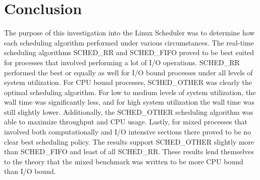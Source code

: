 ﻿\section{Conclusion}

The purpose of this investigation into the Linux Scheduler was to determine how each scheduling algorithm performed under various circumstances.  The real-time scheduling algorithms SCHED\_RR and SCHED\_FIFO proved to be best suited for processes that involved performing a lot of I/O operations.  SCHED\_RR performed the best or equally as well for I/O bound processes under all levels of system utilization.  For CPU bound processes, SCHED\_OTHER was clearly the optimal scheduling algorithm.  For low to medium levels of system utilization, the wall time was significantly less, and for high system utilization the wall time was still slightly lower.  Additionally, the SCHED\_OTHER scheduling algorithm was able to maximize throughput and CPU usage.  Lastly, for mixed processes that involved both computationally and I/O intensive sections there proved to be no clear best scheduling policy.  The results support SCHED\_OTHER slightly more than SCHED\_FIFO and least of all SCHED\_RR.  These results lend themselves to the theory that the mixed benchmark was written to be more CPU bound than I/O bound.
